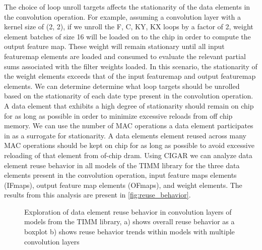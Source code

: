 The choice of loop unroll targets affects the stationarity of the data elements
in the convolution operation. For example, assuming a convolution layer with a
kernel size of (2, 2), if we unroll the F, C, KY, KX loops by a factor of 2,
weight element batches of size 16 will be loaded on to the chip in order to
compute the output feature map. These weight will remain stationary until all
input featuremap elements are loaded and consumed to evaluate the relevant
partial sums associated with the filter weights loaded. In this scenario, the
stationarity of the weight elements exceeds that of the input featuremap and
output featuremap elements.   
We can determine determine what loop targets should be unrolled based on the
stationarity of each date type present in the convolution operation. A data
element that exhibits a high degree of stationarity should remain on chip for as
long as possible in order to minimize excessive reloads from off chip memory. We
can use the number of MAC operations a data element participates in as a
surrogate for stationarity. A data elements element reused across many MAC operations
should be kept on chip for as long as possible to avoid excessive reloading of
that element from of-chip dram. Using CIGAR we can analyze data element reuse
behavior in all models of the TIMM library for the three data elements present in the convolution operation, input
feature maps elements (IFmaps), output feature map elements (OFmaps), and weight
elements. The results from this analysis are present in
\autoref{fig:reuse_behavior}. 

\begin{figure}
    \centering
    \caption{Exploration of data element reuse behavior in convolution layers of models from the TIMM library, a) shows overall reuse behavior as a boxplot b) shows reuse behavior trends within models with multiple convolution layers}
    \label{fig:reuse_behavior}
\end{figure}


